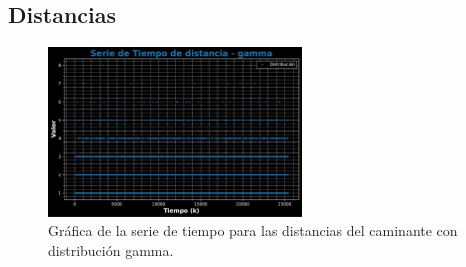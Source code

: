 \documentclass[11pt]{article} %
\begin{document}
	
	
	\newpage
	\subsection{Distancias}
	\begin{figure}[h]
		\centering
		\includegraphics[width=0.6\textwidth]{graf_distancia_gamma.pdf}
		\caption{Gráfica de la serie de tiempo para las distancias del caminante con distribución gamma.}
		\label{fig:distGammaGraf}
	\end{figure}
\end{document}
